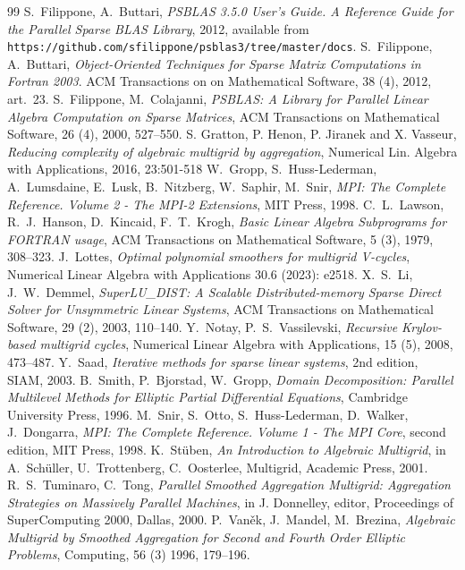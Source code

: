 \begin{thebibliography}{99}
%
S.~Filippone, A.~Buttari,
{\em PSBLAS 3.5.0 User's Guide. A Reference Guide for the Parallel Sparse BLAS Library}, 2012,
available from \texttt{https://github.com/sfilippone/psblas3/tree/master/docs}.
%
S.~Filippone, A.~Buttari,
{\em Object-Oriented Techniques for Sparse Matrix Computations in Fortran 2003}.
ACM Transactions on on Mathematical Software, 38 (4), 2012, art.~23.
%
S.~Filippone, M.~Colajanni,
{\em PSBLAS: A Library for Parallel Linear Algebra
Computation on Sparse Matrices},
ACM Transactions on Mathematical Software, 26 (4), 2000, 527--550.
%
S. Gratton, P. Henon, P. Jiranek and X. Vasseur,
  {\em Reducing complexity of algebraic multigrid by aggregation},
Numerical Lin. Algebra with Applications, 2016, 23:501-518
%
W.~Gropp, S.~Huss-Lederman, A.~Lumsdaine, E.~Lusk, B.~Nitzberg, W.~Saphir, M.~Snir,
{\em MPI: The Complete Reference. Volume 2 - The MPI-2 Extensions},
MIT Press, 1998.
%
C.~L.~Lawson, R.~J.~Hanson, D.~Kincaid, F.~T.~Krogh,
\emph{Basic Linear Algebra Subprograms for FORTRAN usage},
ACM Transactions on Mathematical Software, 5 (3), 1979, 308--323.
%
J.~Lottes, 
\emph{Optimal polynomial smoothers for multigrid V‐cycles}, 
Numerical Linear Algebra with Applications 30.6 (2023): e2518.
%
X.~S.~Li, J.~W.~Demmel,
{\em SuperLU\_DIST: A Scalable Distributed-memory
Sparse Direct Solver for Unsymmetric Linear Systems},
ACM Transactions on Mathematical Software, 29 (2), 2003, 110--140.
%
Y.~Notay, P.~S.~Vassilevski,
{\em Recursive Krylov-based multigrid cycles},
Numerical Linear Algebra with Applications, 15 (5), 2008, 473--487.
%
Y.~Saad,
{\em Iterative methods for sparse linear systems}, 2nd edition, SIAM, 2003.
%
B.~Smith, P.~Bjorstad, W.~Gropp,
{\em Domain Decomposition: Parallel Multilevel Methods for Elliptic
Partial Differential Equations},
Cambridge University Press, 1996.
%
M.~Snir, S.~Otto, S.~Huss-Lederman, D.~Walker, J.~Dongarra,
{\em MPI: The Complete Reference. Volume 1 - The MPI Core}, second edition,
MIT Press, 1998.
%
K.~St\"{u}ben,
{\em An Introduction to Algebraic Multigrid},
in A.~Sch\"{u}ller, U.~Trottenberg, C.~Oosterlee, Multigrid,
Academic Press, 2001.
%
R.~S.~Tuminaro, C.~Tong,
{\em Parallel Smoothed Aggregation Multigrid: Aggregation Strategies on Massively Parallel Machines}, in J. Donnelley, editor, Proceedings of SuperComputing 2000, Dallas, 2000.
%
P.~Van\v{e}k, J.~Mandel, M.~Brezina,
{\em Algebraic Multigrid by Smoothed Aggregation for Second and Fourth Order Elliptic Problems},
Computing, 56 (3) 1996, 179--196.
%
\end{thebibliography}
